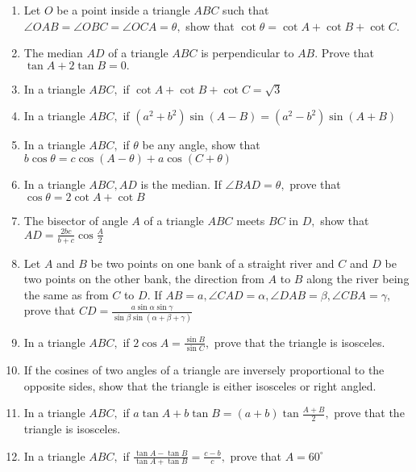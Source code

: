 \begin{enumerate}
\item Let $O$ be a point inside a triangle $ABC$ such that $\angle OAB = \angle OBC = \angle OCA = \theta,$ show
    that $\cot \theta = \cot A + \cot B + \cot C.$

\item The median $AD$ of a triangle $ABC$ is perpendicular to $AB.$ Prove that $\tan A + 2\tan B = 0.$

\item In a triangle $ABC,$ if $\cot A+ \cot B + \cot C = \sqrt{3}$

\item In a triangle $ABC,$ if $(a^2 + b^2)\sin(A - B) = (a^2 - b^2)\sin(A + B)$

\item In a triangle $ABC,$ if $\theta$ be any angle, show that $b\cos\theta = c\cos(A - \theta) + a\cos(C +
    \theta)$

\item In a triangle $ABC, AD$ is the median. If $\angle BAD = \theta,$ prove that $\cos\theta = 2\cot A + \cot B$

\item The bisector of angle $A$ of a triangle $ABC$ meets $BC$ in $D,$ show that $AD = \frac{2bc}{b +
    c}\cos \frac{A}{2}$

\item Let $A$ and $B$ be two points on one bank of a straight river and $C$ and $D$ be two points on the
    other bank, the direction from $A$ to $B$ along the river being the same as from $C$ to $D.$ If
    $AB = a, \angle CAD = \alpha, \angle DAB = \beta, \angle CBA=\gamma,$ prove that $CD =
    \frac{a\sin\alpha\sin\gamma}{\sin\beta \sin(\alpha + \beta + \gamma)}$

\item In a triangle $ABC,$ if $2\cos A = \frac{\sin B}{\sin C},$ prove that the triangle is isosceles.

\item If the cosines of two angles of a triangle are inversely proportional to the opposite sides, show that the triangle is either
    isosceles or right angled.

\item In a triangle $ABC,$ if $a\tan A + b\tan B = (a + b)\tan\frac{A + B}{2},$ prove that the triangle is isosceles.

\item In a triangle $ABC,$ if $\frac{\tan A - \tan B}{\tan A + \tan B} = \frac{c - b}{c},$ prove that $A =
    60^\circ$


\end{enumerate}
